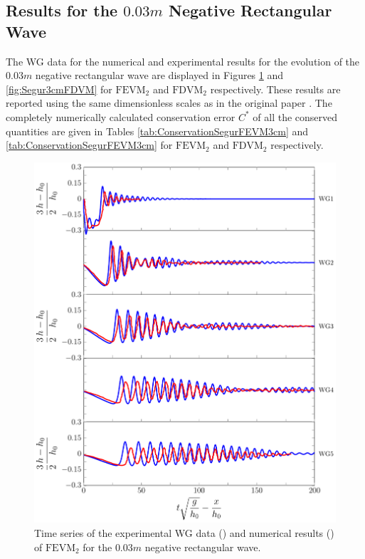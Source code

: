 \subsection{Results for the $0.03m$ Negative Rectangular Wave}
The WG data for the numerical and experimental results for the evolution of the $0.03m$ negative rectangular wave are displayed in Figures \ref{fig:Segur3cmFEVM} and \ref{fig:Segur3cmFDVM} for $\text{FEVM}_2$ and $\text{FDVM}_2$ respectively. These results are reported using the same dimensionless scales as in the original paper \cite{Hammack-Segur-1978-337}. The completely numerically calculated conservation error $C^*$ of all the conserved quantities are given in Tables \ref{tab:ConservationSegurFEVM3cm} and \ref{tab:ConservationSegurFEVM3cm} for $\text{FEVM}_2$ and $\text{FDVM}_2$ respectively.
\begin{figure}
	\centering
	\includegraphics[width=\textwidth]{./chp6/figures/Experiment/Segur/LongWGsFEVM3cm.pdf}
	\caption{Time series of the experimental WG data ({\color{red}\solidrule}) and numerical results ({\color{blue}\solidrule}) of $\text{FEVM}_2$ for the $0.03m$ negative rectangular wave.}
	\label{fig:Segur3cmFEVM}
\end{figure}
